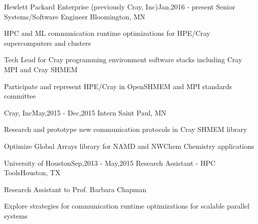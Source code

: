 \begin{rSubsection}{Hewlett Packard Enterprise (previously Cray, Inc)}{Jan,2016 - present}
                   {Senior Systems/Software Engineer}
                   {Bloomington, MN}
\item HPC and ML communication runtime optimizations for HPE/Cray supercomputers
      and clusters
\item Tech Lead for Cray programming environment software stacks including
      Cray MPI and Cray SHMEM
\item Participate and represent HPE/Cray in OpenSHMEM and MPI standards committee
\end{rSubsection}

\begin{rSubsection}{Cray, Inc}{May,2015 - Dec,2015}
                   {Intern}
                   {Saint Paul, MN}
\item Research and prototype new communication protocols in Cray SHMEM library
\item Optimize Global Arrays library for NAMD and NWChem Chemistry applications
\end{rSubsection}

\begin{rSubsection}{University of Houston}{Sep,2013 - May,2015}
                   {Research Assistant - HPC Tools}{Houston, TX}
\item Research Assistant to Prof. Barbara Chapman
\item Explore strategies for communication runtime optimizations for scalable
      parallel systems
\end{rSubsection}
